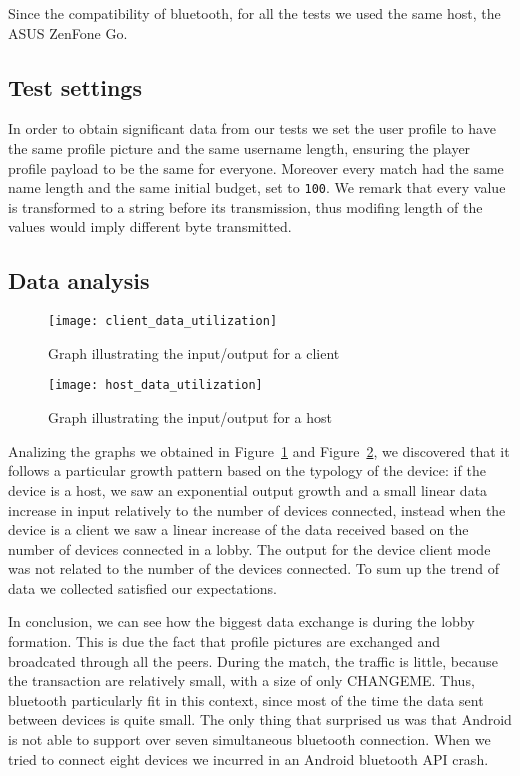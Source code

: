 Since the compatibility of bluetooth, for all the tests we used the same host, 
the ASUS ZenFone Go.

\subsection{Test settings}

In order to obtain significant data from our tests we set the user profile to 
have the same profile picture and the same username length, ensuring the player 
profile payload to be the same for everyone. Moreover every match had the same 
name length and the same initial budget, set to \texttt{100}. We remark 
that every value is transformed to a string before its transmission, thus
modifing length of the values would imply different byte transmitted.

\subsection{Data analysis}
\begin{figure}[t]
 \centering
 \texttt{[image: client\_data\_utilization]}
 \caption{Graph illustrating the input/output for a client}
 \label{fig:res:cdu}
\end{figure}

\begin{figure}[t]
 \centering
 \texttt{[image: host\_data\_utilization]}
 \caption{Graph illustrating the input/output for a host}
 \label{fig:res:hdu}
\end{figure}

Analizing the graphs we obtained in Figure~\ref{fig:res:cdu} and 
Figure~\ref{fig:res:hdu}, we discovered that it follows a particular growth 
pattern based on the typology of the device: if the device is a host, we saw an 
exponential output growth and a small linear data increase in input relatively 
to the number of devices connected, instead when the device is a client we saw a 
linear increase of the data received based on the number of devices connected in 
a lobby. The output for the device client mode was not related to the number of 
the devices connected. To sum up the trend of data we collected satisfied our 
expectations.

In conclusion, we can see how the biggest data exchange is during the lobby 
formation. This is due the fact that profile pictures are exchanged and 
broadcated through all the peers. During the match, the traffic is little, 
because the transaction are relatively small, with a size of only 
CHANGEME. Thus, bluetooth particularly 
fit in this context, since most of the time the data sent between devices is 
quite small.
The only thing that surprised us was that Android is not able to support over 
seven simultaneous bluetooth connection. When we tried to connect eight devices 
we incurred in an Android bluetooth API crash.
